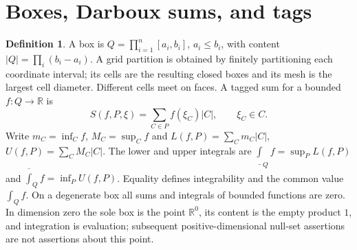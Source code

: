 \documentclass[11pt,oneside,openany]{book}
\theoremstyle{definition}
\newtheorem{definition}[theorem]{Definition}
\theoremstyle{remark}
\newcommand{\R}{\mathbb R}
\newcommand{\family}[1]{}
\begin{document}
\section{Boxes, Darboux sums, and tags}
\family{K04.06.01}\family{K04.06.02}
\begin{definition}\label{d04:06:boxes}
A box is $Q=\prod_{i=1}^n[a_i,b_i]$, $a_i\leq b_i$, with content $|Q|=\prod_i(b_i-a_i)$. A grid partition is obtained by finitely partitioning each coordinate interval; its cells are the resulting closed boxes and its mesh is the largest cell diameter. Different cells meet on faces. A tagged sum for a bounded $f:Q\to\R$ is
\[
 S(f,P,\xi)=\sum_{C\in P}f(\xi_C)|C|,\qquad \xi_C\in C.
\]
Write $m_C=\inf_C f$, $M_C=\sup_C f$ and
$L(f,P)=\sum_C m_C|C|$, $U(f,P)=\sum_C M_C|C|$.
The lower and upper integrals are $\underline{\int}_Q f=\sup_P L(f,P)$ and $\overline{\int}_Qf=\inf_P U(f,P)$. Equality defines integrability and the common value $\int_Q f$.
On a degenerate box all sums and integrals of bounded functions are zero. In dimension zero the sole box is the point $\R^0$, its content is the empty product $1$, and integration is evaluation; subsequent positive-dimensional null-set assertions are not assertions about this point.
\end{definition}
\end{document}

